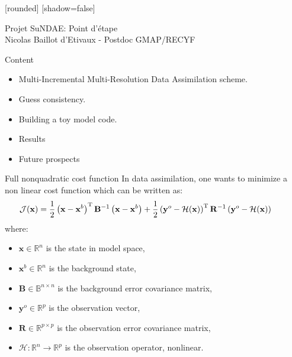 \documentclass[10pt]{beamer}
\title[Nicolas Baillot d'Etivaux]{}
\begin{document}
[rounded]%
[shadow=false]


\begin{frame}
\begin{center}
 \Huge{Projet SuNDAE: Point d'étape}\\
 \vspace{+2cm}
 \Large{Nicolas Baillot d'Etivaux - Postdoc GMAP/RECYF}
\end{center}
\end{frame}


\begin{frame}{Content}
 \begin{itemize}
  \item Multi-Incremental Multi-Resolution Data Assimilation scheme.
  \item Guess consistency.
  \item Building a toy model code.
  \item Results
  \item Future prospects
 \end{itemize}
\end{frame}


\begin{frame}{Full nonquadratic cost function}
In data assimilation, one wants to minimize a non linear cost function which can be written as:
\begin{align}
\hspace{-0.7cm} \mathcal{J}(\mathbf{x}) = \frac{1}{2} \left(\mathbf{x}-\mathbf{x}^b\right)^\mathrm{T} \mathbf{B}^{-1} \left(\mathbf{x}-\mathbf{x}^b\right) + \frac{1}{2} \left(\mathbf{y}^o-\mathcal{H}(\mathbf{x})\right)^\mathrm{T} \mathbf{R}^{-1} \left(\mathbf{y}^o-\mathcal{H}(\mathbf{x})\right)
\end{align}
where:
\begin{itemize}
\item $\mathbf{x} \in \mathbb{R}^n$ is the state in model space,
\item $\mathbf{x}^b \in \mathbb{R}^n$ is the background state,
\item $\mathbf{B} \in \mathbb{B}^{n \times n}$ is the background error covariance matrix,
\item $\mathbf{y}^o \in \mathbb{R}^p$ is the observation vector,
\item $\mathbf{R} \in \mathbb{R}^{p \times p}$ is the observation error covariance matrix,
\item $\mathcal{H} : \mathbb{R}^n \rightarrow \mathbb{R}^p$ is the observation operator, nonlinear.
\end{itemize}
\end{frame}
\end{document}
